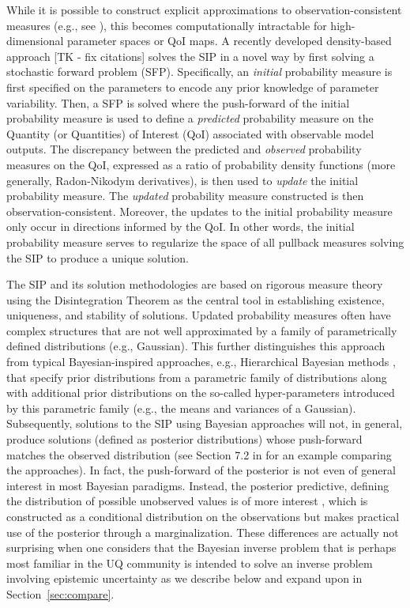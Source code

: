 While it is possible to construct explicit approximations to observation-consistent measures (e.g., see \cite{BET+14}), this becomes computationally intractable for high-dimensional parameter spaces or QoI maps.
A recently developed density-based approach [TK - fix citations]\cite{BJW18a, BJW18b, BWY20} solves the SIP in a novel way by first solving a stochastic forward problem (SFP).
Specifically, an {\em initial} probability measure is first specified on the parameters to encode any prior knowledge of parameter variability.
Then, a SFP is solved where the push-forward of the initial probability measure is used to define a {\em predicted} probability measure on the Quantity (or Quantities) of Interest (QoI) associated with observable model outputs.
The discrepancy between the predicted and {\em observed} probability measures on the QoI, expressed as a ratio of probability density functions (more generally, Radon-Nikodym derivatives), is then used to {\em update} the initial probability measure.
The {\em updated} probability measure constructed is then observation-consistent.
Moreover, the updates to the initial probability measure only occur in directions informed by the QoI.
In other words, the initial probability measure serves to regularize the space of all pullback measures solving the SIP to produce a unique solution.

The SIP and its solution methodologies are based on rigorous measure theory using the Disintegration Theorem \cite{Dellacherie_Meyer_book} as the central tool in establishing existence, uniqueness, and stability of solutions.
Updated probability measures often have complex structures that are not well approximated by a family of parametrically defined distributions (e.g., Gaussian).
This further distinguishes this approach from typical Bayesian-inspired approaches, e.g., Hierarchical Bayesian methods \cite{}, that specify prior distributions from a parametric family of distributions along with additional prior distributions on the so-called hyper-parameters introduced by this parametric family (e.g., the means and variances of a Gaussian).
Subsequently, solutions to the SIP using Bayesian approaches will not, in general, produce solutions (defined as posterior distributions) whose push-forward matches the observed distribution (see Section 7.2 in \cite{BJW18a} for an example comparing the approaches).
In fact, the push-forward of the posterior is not even of general interest in most Bayesian paradigms.
Instead, the posterior predictive, defining the distribution of possible unobserved values is of more interest \cite{}, which is constructed as a conditional distribution on the observations but makes practical use of the posterior through a marginalization.
These differences are actually not surprising when one considers that the Bayesian inverse problem that is perhaps most familiar in the UQ community is intended to solve an inverse problem involving epistemic uncertainty as we describe below and expand upon in Section~\ref{sec:compare}.


